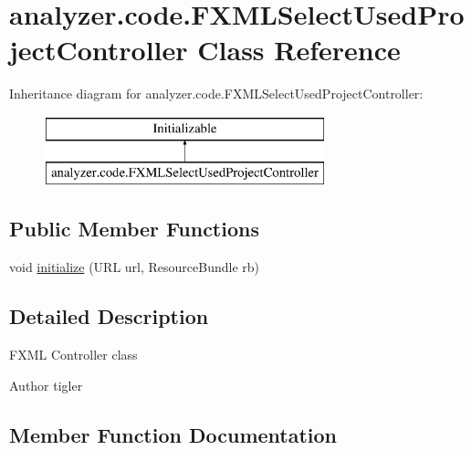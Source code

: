 \hypertarget{classanalyzer_1_1code_1_1FXMLSelectUsedProjectController}{}\section{analyzer.\+code.\+F\+X\+M\+L\+Select\+Used\+Project\+Controller Class Reference}
\label{classanalyzer_1_1code_1_1FXMLSelectUsedProjectController}
Inheritance diagram for analyzer.\+code.\+F\+X\+M\+L\+Select\+Used\+Project\+Controller\+:\begin{figure}[H]
\begin{center}
\leavevmode
\includegraphics[height=2.000000cm]{classanalyzer_1_1code_1_1FXMLSelectUsedProjectController}
\end{center}
\end{figure}
\subsection*{Public Member Functions}
\begin{DoxyCompactItemize}
\item 
void \hyperlink{classanalyzer_1_1code_1_1FXMLSelectUsedProjectController_afe6580b67e899e3bb10ffc60713ec005}{initialize} (U\+RL url, Resource\+Bundle rb)
\end{DoxyCompactItemize}


\subsection{Detailed Description}
F\+X\+ML Controller class

\begin{DoxyAuthor}{Author}
tigler 
\end{DoxyAuthor}


\subsection{Member Function Documentation}
\mbox{\label{classanalyzer_1_1code_1_1FXMLSelectUsedProjectController_afe6580b67e899e3bb10ffc60713ec005}} 
